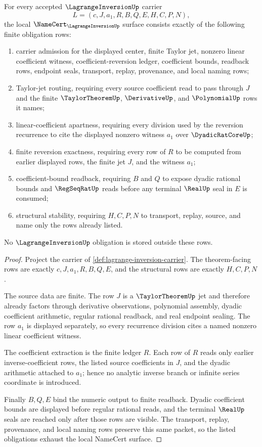 \begin{theorem}
\label{thm:lagrange-inversion-namecert-obligations}
For every accepted $\LagrangeInversionUp$ carrier
$$
L=(c,J,a_1,R,B,Q,E,H,C,P,N),
$$
the local $\NameCert_{\LagrangeInversionUp}$ surface consists exactly of the following finite obligation rows:
\begin{enumerate}
\item carrier admission for the displayed center, finite Taylor jet, nonzero linear coefficient witness, coefficient-reversion ledger, coefficient bounds, readback rows, endpoint seals, transport, replay, provenance, and local naming rows;
\item Taylor-jet routing, requiring every source coefficient read to pass through $J$ and the finite $\TaylorTheoremUp$, $\DerivativeUp$, and $\PolynomialUp$ rows it names;
\item linear-coefficient apartness, requiring every division used by the reversion recurrence to cite the displayed nonzero witness $a_1$ over $\DyadicRatCoreUp$;
\item finite reversion exactness, requiring every row of $R$ to be computed from earlier displayed rows, the finite jet $J$, and the witness $a_1$;
\item coefficient-bound readback, requiring $B$ and $Q$ to expose dyadic rational bounds and $\RegSeqRatUp$ reads before any terminal $\RealUp$ seal in $E$ is consumed;
\item structural stability, requiring $H,C,P,N$ to transport, replay, source, and name only the rows already listed.
\end{enumerate}
No $\LagrangeInversionUp$ obligation is stored outside these rows.
\end{theorem}
\begin{proof}
Project the carrier of \autoref{def:lagrange-inversion-carrier}. The theorem-facing rows are exactly $c,J,a_1,R,B,Q,E$, and the structural rows are exactly $H,C,P,N$.

The source data are finite. The row $J$ is a $\TaylorTheoremUp$ jet and therefore already factors through derivative observations, polynomial assembly, dyadic coefficient arithmetic, regular rational readback, and real endpoint sealing. The row $a_1$ is displayed separately, so every recurrence division cites a named nonzero linear coefficient witness.

The coefficient extraction is the finite ledger $R$. Each row of $R$ reads only earlier inverse-coefficient rows, the listed source coefficients in $J$, and the dyadic arithmetic attached to $a_1$; hence no analytic inverse branch or infinite series coordinate is introduced.

Finally $B,Q,E$ bind the numeric output to finite readback. Dyadic coefficient bounds are displayed before regular rational reads, and the terminal $\RealUp$ seals are reached only after those rows are visible. The transport, replay, provenance, and local naming rows preserve this same packet, so the listed obligations exhaust the local NameCert surface.
\end{proof}

